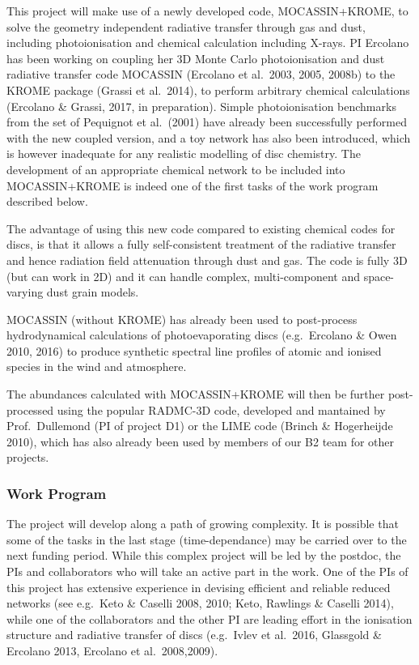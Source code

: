 \documentclass[10pt,fleqn,twoside]{article}
\begin{document}
This project will make use of a newly developed code, MOCASSIN+KROME, to solve the geometry independent radiative transfer through gas  and dust, including photoionisation and chemical calculation
  including X-rays. PI Ercolano has been working on coupling her 3D Monte Carlo photoionisation
and dust radiative transfer code MOCASSIN (Ercolano et al.\ 2003, 2005,
2008b) to the KROME package (Grassi et al.\ 2014), to perform arbitrary
chemical calculations (Ercolano \& Grassi, 2017, in
preparation). Simple photoionisation benchmarks from the set of
Pequignot et al.\ (2001) have already been successfully performed with
the new coupled version, and a toy network has also
been introduced, which is however inadequate for any realistic
modelling of disc chemistry. The development of an appropriate
chemical network to be included into MOCASSIN+KROME is indeed one of
the first tasks of the work program described below.

The advantage of using this new code compared to existing chemical
codes for discs, is that it allows a fully self-consistent treatment
of the radiative transfer and hence radiation field attenuation
through dust and gas. The code is fully 3D (but can work in 2D) and it
can handle complex, multi-component and space-varying dust grain models. 

MOCASSIN (without KROME) has already been used to post-process
hydrodynamical calculations of photoevaporating discs (e.g.\ Ercolano
\& Owen 2010, 2016) to produce synthetic spectral line profiles of
atomic and ionised species in the wind and atmosphere. 

The abundances calculated with MOCASSIN+KROME will then be further
post-processed using the popular RADMC-3D code, developed and mantained
by Prof.\ Dullemond (PI of project D1) or the LIME code (Brinch \&
Hogerheijde 2010), which has also already been used by members of our
B2 team for other projects. 


\subsubsection{Work Program}


The project will develop along a path of growing complexity. It is possible that some of the tasks in the last stage (time-dependance) may be carried over to the next funding period. While this complex project will be led by the postdoc, the PIs and collaborators who will take an active part in the work. One of the PIs of this project has extensive experience in devising efficient and reliable reduced networks (see e.g.\ Keto \& Caselli 2008, 2010; Keto, Rawlings \& Caselli 2014), while one of the collaborators and the other PI are leading effort in the ionisation structure and radiative transfer of discs (e.g.\ Ivlev et al.\ 2016, Glassgold \& Ercolano 2013, Ercolano et al.\ 2008,2009).  
\end{document}
